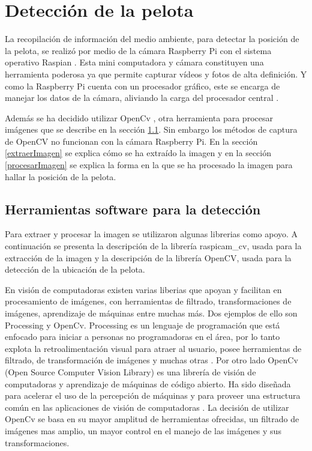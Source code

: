 \section{Detección de la pelota}\label{chapter:deteccion}

La recopilación de información del medio ambiente, para detectar la posición de la pelota, se realiz\'o por medio de la cámara Raspberry Pi con el sistema operativo Raspian \cite{raspian}. Esta mini computadora y cámara constituyen una herramienta poderosa ya que permite capturar v\'ideos y fotos de alta definici\'on. Y como la Raspberry Pi cuenta con un procesador gr\'afico, este se encarga de manejar los datos de la cámara, aliviando la carga del procesador central \cite{raspCamArti}.

Además se ha decidido utilizar OpenCv \cite{opencv}, otra herramienta para procesar im\'agenes que se describe en la sección \ref{herramientasDetc}. Sin embargo los métodos de captura de OpenCV no funcionan con la c\'amara Raspberry Pi. En la secci\'on \ref{extraerImagen} se explica c\'omo se ha extra\'ido la imagen y en la secci\'on \ref{procesarImagen} se explica la forma en la que se ha procesado la imagen para hallar la posición de la pelota. 

\subsection{Herramientas software para la detecci\'on }\label{herramientasDetc}

Para extraer y procesar la imagen se utilizaron algunas librerias como apoyo. A continuación se presenta la descripción de la librería raspicam\_cv, usada para la extracción de la imagen y la descripción de la librería OpenCV, usada para la detección de la ubicación de la pelota.   

En visi\'on de computadoras existen varias liberias que apoyan y facilitan en procesamiento de im\'agenes, con herramientas de filtrado, transformaciones de im\'agenes, aprendizaje de m\'aquinas entre muchas m\'as. Dos ejemplos de ello son Processing \cite{processing} y OpenCv. Processing es un lenguaje de programaci\'on que está enfocado para iniciar a personas no programadoras en el \'area, por lo tanto explota la retroalimentaci\'on visual para atraer al usuario, posee herramientas de filtrado, de transformaci\'on de im\'agenes y muchas otras .
Por otro lado OpenCv (Open Source Computer Vision Library) es una librería de visión de computadoras y aprendizaje de máquinas de código abierto. Ha sido diseñada para acelerar el uso de la percepción de m\'aquinas y para proveer una estructura común en las aplicaciones de visión de computadoras \cite{opencv}. La decisi\'on de utilizar OpenCv se basa en su mayor amplitud de herramientas ofrecidas, un filtrado de im\'agenes mas amplio, un mayor control en el manejo de las im\'agenes y sus transformaciones.

